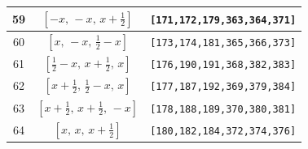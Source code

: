 \documentclass[fleqn,8pt]{jsarticle}
\begin{document}
\begin{longtable}{ccc}
59 & $\left[ - x,\, - x,\, x + \frac{1}{2} \right]$ & {\tt [171,172,179,363,364,371]} \\ \hline
60 & $\left[ x,\, - x,\, \frac{1}{2} - x \right]$ & {\tt [173,174,181,365,366,373]} \\ \hline
61 & $\left[ \frac{1}{2} - x,\, x + \frac{1}{2},\, x \right]$ & {\tt [176,190,191,368,382,383]} \\ \hline
62 & $\left[ x + \frac{1}{2},\, \frac{1}{2} - x,\, x \right]$ & {\tt [177,187,192,369,379,384]} \\ \hline
63 & $\left[ x + \frac{1}{2},\, x + \frac{1}{2},\, - x \right]$ & {\tt [178,188,189,370,380,381]} \\ \hline
64 & $\left[ x,\, x,\, x + \frac{1}{2} \right]$ & {\tt [180,182,184,372,374,376]} \\
\end{longtable}
\renewcommand{\arraystretch}{1.2}
\end{document}
